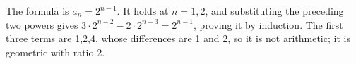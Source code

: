 The formula is $\boxed{a_n=2^{n-1}}$. It holds at $n=1,2$, and substituting the preceding two powers gives $3\cdot2^{n-2}-2\cdot2^{n-3}=2^{n-1}$, proving it by induction. The first three terms are 1,2,4, whose differences are 1 and 2, so it is not arithmetic; it is geometric with ratio 2.
